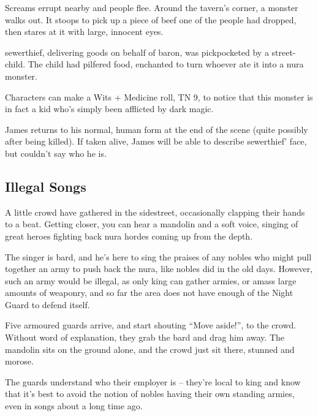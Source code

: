 \begin{boxtext}
	Screams errupt nearby and people flee.  Around the tavern's corner, a monster walks out.  It stoops to pick up a piece of beef one of the people had dropped, then stares at it with large, innocent eyes.
\end{boxtext}

\Gls{sewerthief}, delivering goods on behalf of \gls{baron}, was pickpocketed by a street-child.  The child had pilfered food, enchanted to turn whoever ate it into a nura monster.


Characters can make a Wits + Medicine roll, TN 9, to notice that this monster is in fact a kid who's simply been afflicted by dark magic.


\deephobgoblin

James returns to his normal, human form at the end of the scene (quite possibly after being killed).  If taken alive, James will be able to describe \gls{sewerthief}' face, but couldn't say who he is.

\subsection{Illegal Songs}

\begin{boxtext}
	A little crowd have gathered in the sidestreet, occasionally clapping their hands to a beat.  Getting closer, you can hear a mandolin and a soft voice, singing of great heroes fighting back nura hordes coming up from the depth.
\end{boxtext}

The singer is \gls{bard}, and he's here to sing the praises of any nobles who might pull together an army to push back the nura, like nobles did in the old days.  However, such an army would be illegal, as only \gls{king} can gather armies, or amass large amounts of weaponry, and so far the area does not have enough of the Night Guard to defend itself.

\begin{boxtext}
	Five armoured guards arrive, and start shouting ``Move aside!'', to the crowd.  Without word of explanation, they grab the bard and drag him away.  The mandolin sits on the ground alone, and the crowd just sit there, stunned and morose.
\end{boxtext}

The guards understand who their employer is -- they're local to \gls{king} and know that it's best to avoid the notion of nobles having their own standing armies, even in songs about a long time ago.

